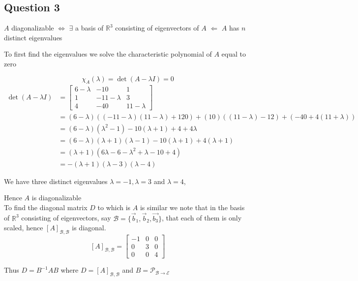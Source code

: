 \documentclass{article}
\begin{document}
\subsection*{Question 3}
\(A\) diagonalizable \(\iff\) \(\exists\) a basis of \(\mathbb{R}^3\) consisting of eigenvectors of \(A\) \(\Leftarrow\) \(A\) has \(n\) distinct eigenvalues

To first find the eigenvalues we solve the characteristic polynomial of \(A\) equal to zero

\[
\chi_A(\lambda) = \det(A-\lambda I) = 0
\]
\begin{align*}
    \det(A-\lambda I) &= \begin{bmatrix}
        6 - \lambda & -10 & 1 \\
        1 & -11 -\lambda & 3 \\
        4 & -40 & 11 - \lambda
    \end{bmatrix}
    \\
    &= (6-\lambda)((-11-\lambda)(11 - \lambda) + 120) + (10)((11 - \lambda) -12) + (-40 + 4(11 + \lambda))
    \\
    &= (6 - \lambda)(\lambda^2 -1) -10(\lambda + 1) + 4 + 4\lambda
    \\
    &= (6- \lambda)(\lambda + 1)(\lambda -1) - 10(\lambda + 1) + 4(\lambda +1)
    \\
    &= (\lambda+1)(6\lambda - 6 - \lambda^2 + \lambda -10 +4)
    \\
    &= -(\lambda + 1)(\lambda -3)(\lambda -4)
\end{align*}

We have three distinct eigenvalues \(\lambda = -1, \lambda = 3\) and \(\lambda = 4\),

Hence \(A\) is diagonalizable
\\

To find the diagonal matrix \(D\) to which is \(A\) is similar we note that in the basis of \(\mathbb{R}^3\) consisting 
of eigenvectors, say \(\mathcal{B} = \{\vec{b}_1, \vec{b}_2, \vec{b_3}\}\), that each of them is only scaled, hence \([A]_{\mathcal{B},\mathcal{B}}\) is diagonal.
\[
[A]_{\mathcal{B}, \mathcal{B}} = \begin{bmatrix}
    -1 & 0 & 0 \\
    0 & 3 & 0 \\
    0 & 0 & 4
\end{bmatrix}
\]

Thus \(D = B^{-1} A B\) where \(D = [A]_{\mathcal{B}, \mathcal{B}}\) and \(B = \mathcal{P}_{\mathcal{B}\to \mathcal{E}}\)
\\
\end{document}
